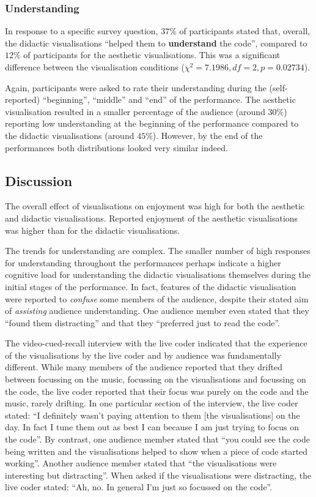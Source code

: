 \documentclass{sig-alternate}
\begin{document}
\subsubsection{Understanding}

In response to a specific survey question, $37\%$ of participants
stated that, overall, the didactic visualisations ``helped them to
\textbf{understand} the code'', compared to $12\%$ of participants for
the aesthetic visualisations. This was a significant difference
between the visualisation conditions ($\chi^2=7.1986,df=2,p=0.02734$).

Again, participants were asked to rate their understanding during the
(self-reported) ``beginning'', ``middle'' and ``end'' of the
performance. The aesthetic visualisation resulted in a smaller
percentage of the audience (around $30\%$) reporting low understanding
at the beginning of the performance compared to the didactic
visualisations (around $45\%$). However, by the end of the
performances both distributions looked very similar indeed.

\pagebreak

\subsection{Discussion}

The overall effect of visualisations on enjoyment was high for both
the aesthetic and didactic visualisations. Reported enjoyment of the
aesthetic visualisations was higher than for the didactic
visualisations.

The trends for understanding are complex. The smaller number of high
responses for understanding throughout the performances perhaps
indicate a higher cognitive load for understanding the didactic
visualisations themselves during the initial stages of the
performance. In fact, features of the didactic visualisation were
reported to \emph{confuse} some members of the audience, despite their
stated aim of \emph{assisting} audience understanding. One audience
member even stated that they ``found them distracting'' and that they
``preferred just to read the code''.

The video-cued-recall interview with the live coder indicated that the
experience of the visualisations by the live coder and by audience was
fundamentally different. While many members of the audience reported
that they drifted between focussing on the music, focussing on the
visualisations and focussing on the code, the live coder reported that
their focus was purely on the code and the music, rarely drifting. In
one particular section of the interview, the live coder stated: ``I
definitely wasn't paying attention to them [the visualisations] on the
day. In fact I tune them out as best I can because I am just trying to
focus on the code''. By contrast, one audience member stated that
``you could see the code being written and the visualisations helped
to show when a piece of code started working''. Another audience
member stated that ``the visualisations were interesting but
distracting''. When asked if the visualisations were distracting, the
live coder stated: ``Ah, no. In general I'm just so focussed on the
code''.
\end{document}

